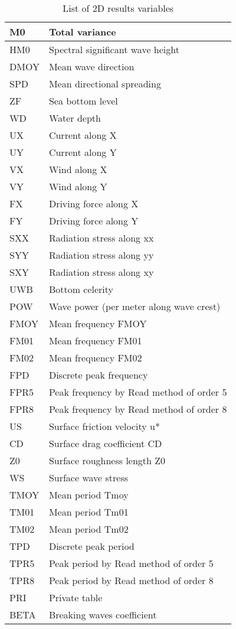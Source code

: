 \begin{table}
\begin{tabular}{|p{1.4in}|p{2.1in}|} \hline
M0 &  Total variance \\ \hline
HM0  &  Spectral significant wave height  \\ \hline
DMOY  &  Mean wave direction  \\ \hline
SPD  &  Mean directional spreading  \\ \hline
ZF &  Sea bottom level  \\ \hline
WD &  Water depth  \\ \hline
UX &  Current along X  \\ \hline
UY &  Current along Y  \\ \hline
VX &  Wind along X  \\ \hline
VY &  Wind along Y  \\ \hline
FX &  Driving force along X  \\ \hline
FY &  Driving force along Y  \\ \hline
SXX  &  Radiation stress along xx  \\ \hline
SYY  &  Radiation stress along yy  \\ \hline
SXY  &  Radiation stress along xy  \\ \hline
UWB  &  Bottom celerity  \\ \hline
POW  &  Wave power (per meter along wave crest)  \\ \hline
FMOY  &  Mean frequency FMOY  \\ \hline
FM01  &  Mean frequency FM01  \\ \hline
FM02  &  Mean frequency FM02  \\ \hline
FPD  &  Discrete peak frequency  \\ \hline
FPR5  &  Peak frequency by Read method of order 5  \\ \hline
FPR8  &  Peak frequency by Read method of order 8  \\ \hline
US &  Surface friction velocity u*  \\ \hline
CD &  Surface drag coefficient CD  \\ \hline
Z0 &  Surface roughness length Z0  \\ \hline
WS &  Surface wave stress  \\ \hline
TMOY  &  Mean period Tmoy  \\ \hline
TM01  &  Mean period Tm01  \\ \hline
TM02  &  Mean period Tm02  \\ \hline
TPD  &  Discrete peak period  \\ \hline
TPR5  &  Peak period by Read method of order 5  \\ \hline
TPR8  &  Peak period by Read method of order 8  \\ \hline
PRI  &  Private table  \\ \hline
BETA &  Breaking waves coefficient \\ \hline
\end{tabular}
\caption{\label{tab:resultvar}List of 2D results variables}
\end{table}

